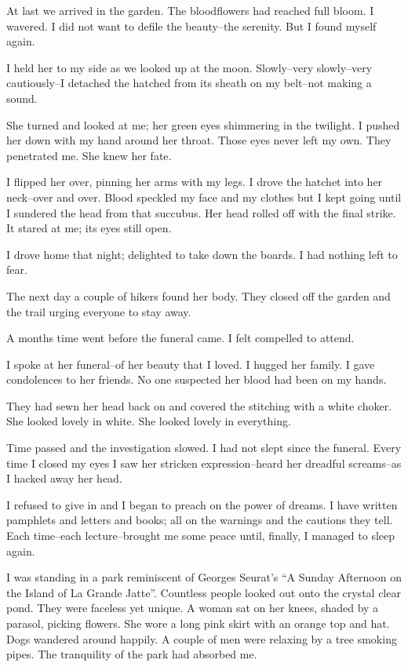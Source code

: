 \documentclass{article}
\begin{document}
At last we arrived in the garden.
The bloodflowers had reached full bloom.
I wavered.  I did not want to defile the beauty--the serenity.
But I found myself again.


I held her to my side as we looked up at the moon.
Slowly--very slowly--very cautiously--I
detached the hatched from its sheath on my belt--not making a sound.


She turned and looked at me; her green eyes shimmering in the twilight.
I pushed her down with my hand around her throat.
Those eyes never left my own. They penetrated me.
She knew her fate.


I flipped her over, pinning her arms with my legs.
I drove the hatchet into her neck--over and over.
Blood speckled my face and my clothes but I kept going
until I sundered the head from that succubus.
Her head rolled off with the final strike.
It stared at me; its eyes still open.


I drove home that night;
delighted to take down the boards.
I had nothing left to fear.
\VV


\noindent
The next day a couple of hikers found her body.
They closed off the garden and the trail
urging everyone to stay away.


A months time went before the funeral came.
I felt compelled to attend.


I spoke at her funeral--of her beauty that I loved.
I hugged her family.
I gave condolences to her friends.
No one suspected her blood had been on my hands.


They had sewn her head back on and covered the
stitching with a white choker.
She looked lovely in white.
She looked lovely in everything.
\VV


\noindent
Time passed and the investigation slowed.
I had not slept since the funeral.
Every time I closed my eyes I saw her stricken expression--heard
her dreadful screams--as I hacked away her head.


I refused to give in and I began to preach on the power of dreams.
I have written pamphlets and letters and books;
all on the warnings and the cautions they tell.
Each time--each lecture--brought me some peace
until, finally, I managed to sleep again.
\vvvv


\noindent
I was standing in a park reminiscent of
Georges Seurat's ``A Sunday Afternoon on the Island of La Grande Jatte''.
Countless people looked out onto the crystal clear pond.
They were faceless yet unique.
A woman sat on her knees, shaded by a parasol, picking flowers.
She wore a long pink skirt with an orange top and hat.
Dogs wandered around happily.
A couple of men were relaxing by a tree smoking pipes.
The tranquility of the park had absorbed me.
\end{document}
